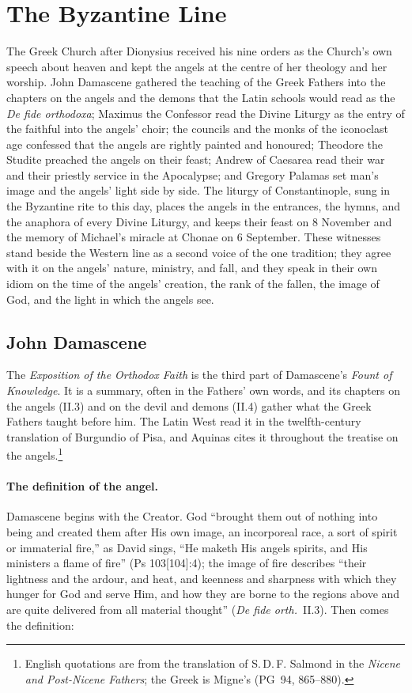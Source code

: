 \section{The Byzantine Line}\label{sec:byzantine}

The Greek Church after Dionysius received his nine orders as the Church's
own speech about heaven and kept the angels at the centre of her theology
and her worship. John Damascene gathered the teaching of the Greek Fathers
into the chapters on the angels and the demons that the Latin schools would
read as the \emph{De fide orthodoxa}; Maximus the Confessor read the Divine
Liturgy as the entry of the faithful into the angels' choir; the councils
and the monks of the iconoclast age confessed that the angels are rightly
painted and honoured; Theodore the Studite preached the angels on their
feast; Andrew of Caesarea read their war and their priestly service in the
Apocalypse; and Gregory Palamas set man's image and the angels' light side
by side. The liturgy of Constantinople, sung in the Byzantine rite to this
day, places the angels in the entrances, the hymns, and the anaphora of
every Divine Liturgy, and keeps their feast on 8 November and the memory of
Michael's miracle at Chonae on 6 September. These witnesses stand beside the
Western line as a second voice of the one tradition; they agree with it on
the angels' nature, ministry, and fall, and they speak in their own idiom on
the time of the angels' creation, the rank of the fallen, the image of God,
and the light in which the angels see.

\sectionguard
\subsection{John Damascene}\label{sec:bz-damascene}

The \emph{Exposition of the Orthodox Faith} is the third part of
Damascene's \emph{Fount of Knowledge}. It is a summary, often in the
Fathers' own words, and its chapters on the angels (II.3) and on the devil
and demons (II.4) gather what the Greek Fathers taught before him. The
Latin West read it in the twelfth-century translation of Burgundio of
Pisa, and Aquinas cites it throughout the treatise on the angels.\footnote{English
quotations are from the translation of S.\,D.\,F. Salmond in the
\emph{Nicene and Post-Nicene Fathers}; the Greek is Migne's (PG~94,
865--880).}

\paragraph{The definition of the angel.} Damascene begins with the
Creator. God ``brought them out of nothing into being and created them after
His own image, an incorporeal race, a sort of spirit or immaterial fire,''
as David sings, ``He maketh His angels spirits, and His ministers a flame of
fire'' (Ps 103[104]:4); the image of fire describes ``their lightness and
the ardour, and heat, and keenness and sharpness with which they hunger for
God and serve Him, and how they are borne to the regions above and are
quite delivered from all material thought'' (\emph{De fide orth.}\ II.3).
Then comes the definition:

